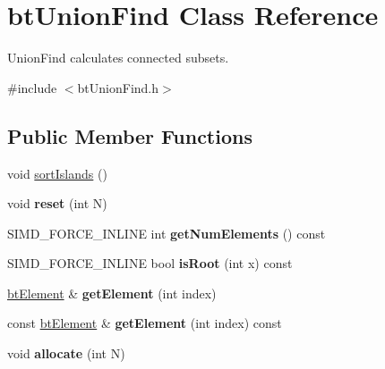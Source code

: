 \hypertarget{classbt_union_find}{\section{bt\+Union\+Find Class Reference}
\label{classbt_union_find}
}


Union\+Find calculates connected subsets.  




{\ttfamily \#include $<$bt\+Union\+Find.\+h$>$}

\subsection*{Public Member Functions}
\begin{DoxyCompactItemize}
\item 
void \hyperlink{classbt_union_find_a8bf4647f84d20b033e0d0a7188f3b798}{sort\+Islands} ()
\item 
\hypertarget{classbt_union_find_a2c0b1e855d522d3993fc5ba98dc8b1d4}{void {\bfseries reset} (int N)}\label{classbt_union_find_a2c0b1e855d522d3993fc5ba98dc8b1d4}

\item 
\hypertarget{classbt_union_find_a89310eac5261eaa57051d1b4990605c8}{S\+I\+M\+D\+\_\+\+F\+O\+R\+C\+E\+\_\+\+I\+N\+L\+I\+N\+E int {\bfseries get\+Num\+Elements} () const }\label{classbt_union_find_a89310eac5261eaa57051d1b4990605c8}

\item 
\hypertarget{classbt_union_find_a2c33f62b34077cfee0a43a4f99d2336b}{S\+I\+M\+D\+\_\+\+F\+O\+R\+C\+E\+\_\+\+I\+N\+L\+I\+N\+E bool {\bfseries is\+Root} (int x) const }\label{classbt_union_find_a2c33f62b34077cfee0a43a4f99d2336b}

\item 
\hypertarget{classbt_union_find_ab9c9ac633e6a3a43f90da29845b92bd3}{\hyperlink{structbt_element}{bt\+Element} \& {\bfseries get\+Element} (int index)}\label{classbt_union_find_ab9c9ac633e6a3a43f90da29845b92bd3}

\item 
\hypertarget{classbt_union_find_a9746e824212c4aa849ad17e3e8f81ab0}{const \hyperlink{structbt_element}{bt\+Element} \& {\bfseries get\+Element} (int index) const }\label{classbt_union_find_a9746e824212c4aa849ad17e3e8f81ab0}

\item 
\hypertarget{classbt_union_find_a4d4e2f8ef29c5f86f693d2340a5c377b}{void {\bfseries allocate} (int N)}\label{classbt_union_find_a4d4e2f8ef29c5f86f693d2340a5c377b}


\end{DoxyCompactItemize}

